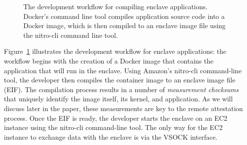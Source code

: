 \begin{figure}[t]
  \centering
  
  \caption{The development workflow for compiling enclave applications.
  Docker's command line tool compiles application source code into a Docker
  image, which is then compiled to an enclave image file using the nitro-cli
  command line tool.}
  \label{fig:dev-workflow}
\end{figure}

Figure~\ref{fig:dev-workflow} illustrates the development workflow for enclave
applications: the workflow begins with the creation of a Docker image that
contains the application that will run in the enclave.  Using Amazon's
nitro-cli command-line tool, the developer then compiles the container image to
an enclave image file (EIF).  The compilation process results in a number of
\emph{measurement checksums} that uniquely identify the image itself, its
kernel, and application.  As we will discuss later in the paper, these
measurements are key to the remote attestation process.
%
Once the EIF is ready, the developer starts the enclave on an EC2 instance
using the nitro-cli command-line tool.  The only way for the EC2 instance to
exchange data with the enclave is via the VSOCK interface.
